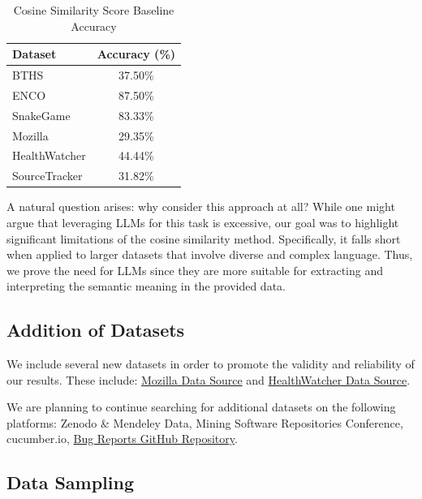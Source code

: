 \documentclass[conference]{IEEEtran}
\begin{document}
\begin{table}[h]
    \centering
    \caption{Cosine Similarity Score Baseline Accuracy}
    \renewcommand{\arraystretch}{1.2}
    \begin{tabular}{|l|c|}
    \hline
    \textbf{Dataset} & \textbf{Accuracy (\%)} \\
    \hline
    BTHS & 37.50\% \\
    ENCO & 87.50\% \\
    SnakeGame & 83.33\% \\
    Mozilla & 29.35\% \\
    HealthWatcher & 44.44\% \\
    SourceTracker & 31.82\% \\
    \hline
    \end{tabular}
    \label{tab:cosine-baseline}
\end{table}

A natural question arises: why consider this approach at all? While one might argue that leveraging LLMs for this task is excessive, our goal was to highlight significant limitations of the cosine similarity method. Specifically, it falls short when applied to larger datasets that involve diverse and complex language. 
Thus, we prove the need for LLMs since they are more suitable for extracting and interpreting the semantic meaning in the provided data. 

\subsection{Addition of Datasets}

We include several new datasets in order to promote the validity and reliability of our results. These include: \href{https://data.mendeley.com/datasets/jw5bgshtvg/1}{Mozilla Data Source} and \href{https://zenodo.org/records/8081523}{HealthWatcher Data Source}.

We are planning to continue searching for additional datasets on the following platforms: Zenodo \& Mendeley Data, Mining Software Repositories Conference, cucumber.io, \href{https://github.com/jiwangjie/ChatBR/tree/master/questions/question1/final_sample}{Bug Reports GitHub Repository}.

\subsection{Data Sampling}
\end{document}
